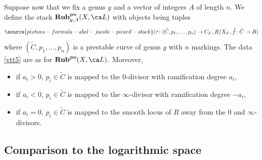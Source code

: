 Suppose now that we fix a genus $g$ and a vector of integers $A$ of length $n$. We define the stack $\cat{Rub}^{\pre}_{g,A}(X, \ca L)$ with objects being tuples
\begin{equation}\label{vtt5}
\source{pixtons-formula-abel-jacobi-picard-stack}
(\tau\colon (\tilde C, p_1,\ldots,p_n) \to C_S\, , \R/X_S\, , \tilde{f}\colon \tilde C \to \R)
\end{equation}
where $(\tilde{C},p_1,\ldots,p_n)$ is a prestable curve of genus $g$ with $n$
markings.
The data \eqref{vtt5} are as for $\cat{Rub}^{\pre}(X, \ca L)$. Moreover,
\begin{itemize}

\item[$\bullet$]
if $a_i >0$,  $p_i\in \tilde{C}$ is mapped to the $0$-divisor with
 ramification degree $a_i$,
 \item[$\bullet$]
if $a_i <0$,  $p_i\in \tilde{C}$ is mapped to the $\infty$-divisor with
 ramification degree $-a_i$,
\item[$\bullet$] if $a_i=0$, $p_i\in \tilde{C}$ is mapped to the smooth locus of $R$
away from the $0$ and $\infty$-divisors.
\end{itemize}



\subsection{Comparison to the logarithmic space}\label{clog}




